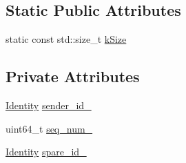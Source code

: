 \subsection*{Static Public Attributes}
\begin{DoxyCompactItemize}
\item 
static const std\-::size\-\_\-t \hyperlink{classapollo_1_1cyber_1_1transport_1_1MessageInfo_a7506dd643a8a4d2b3707f54d424b7389}{k\-Size}
\end{DoxyCompactItemize}
\subsection*{Private Attributes}
\begin{DoxyCompactItemize}
\item 
\hyperlink{classapollo_1_1cyber_1_1transport_1_1Identity}{Identity} \hyperlink{classapollo_1_1cyber_1_1transport_1_1MessageInfo_a30a37ac7e733d9d8f7b8465fb165925d}{sender\-\_\-id\-\_\-}
\item 
uint64\-\_\-t \hyperlink{classapollo_1_1cyber_1_1transport_1_1MessageInfo_a78abfdb342da85f376042164f02141c7}{seq\-\_\-num\-\_\-}
\item 
\hyperlink{classapollo_1_1cyber_1_1transport_1_1Identity}{Identity} \hyperlink{classapollo_1_1cyber_1_1transport_1_1MessageInfo_aac263f9a5ad9550b87af4b0284656c47}{spare\-\_\-id\-\_\-}
\end{DoxyCompactItemize}


